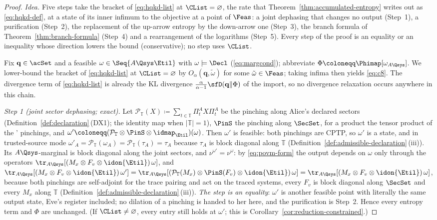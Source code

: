 \begin{proof}
\emph{Idea.} Five steps take the bracket of \eqref{eq:hqkd-list} at
$\CList=\varnothing$, the rate that Theorem~\ref{thm:accumulated-entropy}
writes out as \eqref{eq:hqkd-def}, at a state of its inner infimum to the objective at a point of $\Feas$: a joint dephasing that
changes no output (Step~1), a purification (Step~2), the replacement of the
up-arrow entropy by the down-arrow one (Step~3), the branch formula of
Theorem~\ref{thm:branch-formula} (Step~4) and a rearrangement of the
logarithms (Step~5). Every step of the proof is an equality or an inequality
whose direction lowers the bound (conservative); no step uses $\CList$.

Fix $\mathbf q\in\acSet$ and a feasible $\omega\in\Seq{A\Qsys\Etil}$ with
$\omega\models\Decl$ (\eqref{eq:margcond}); abbreviate
$\Phi\coloneqq\Phimap[\omega_{A\Qsys}]$. We
lower-bound the bracket of \eqref{eq:hqkd-list} at $\CList=\varnothing$ by
$O_{\alpha}(\mathbf q,\tilde\omega)$ for some $\tilde\omega\in\Feas$; taking
infima then yields \eqref{eq:c8}. The divergence term of
\eqref{eq:hqkd-list} is already the KL divergence
$\frac{\alpha}{\alpha-1}\sfD(\mathbf q\|\Phi)$ of the import, so no
divergence relaxation occurs anywhere in this chain.

\emph{Step 1 (joint sector dephasing; exact).} Let
$\mathcal{P}_{\mathbb{T}}(X)\coloneqq\sum_{t\in\mathbb{T}}\Pi^{A}_tX\Pi^{A}_t$ be
the pinching along Alice's declared sectors
(Definition~\ref{def:declaration}\,(DX1); the identity map when
$|\mathbb{T}|=1$), $\PinS$ the pinching along $\SecSet$, for a product
 the tensor product of the
' pinchings, and
$\omega'\coloneqq(\mathcal{P}_{\mathbb{T}}\otimes\PinS\otimes\idmap_{\Etil})(\omega)$.
Then $\omega'$ is feasible: both pinchings are CPTP, so $\omega'$ is a
state, and in trusted-source mode
$\omega'_A=\mathcal{P}_{\mathbb{T}}(\omega_A)
=\mathcal{P}_{\mathbb{T}}(\tau_A)=\tau_A$ because $\tau_A$ is block diagonal
along $\mathbb{T}$ (Definition~\ref{def:admissible-declaration}\,(iii)). Its
$A\Qsys$-marginal is block diagonal along the joint sectors, and
$\nu^{\omega'}=\nu^{\omega}$: by \eqref{eq:povm-form} the output depends on
$\omega$ only through the operators
$\tr_{A\Qsys}[(M_x\otimes F_v\otimes\idon{\Etil})\,\omega]$, and
$\tr_{A\Qsys}[(M_x\otimes F_v\otimes\idon{\Etil})\,\omega']
=\tr_{A\Qsys}[(\mathcal{P}_{\mathbb{T}}(M_x)\otimes\PinS(F_v)\otimes
\idon{\Etil})\,\omega]
=\tr_{A\Qsys}[(M_x\otimes F_v\otimes\idon{\Etil})\,\omega]$, because both
pinchings are self-adjoint for the trace pairing and act on the traced
systems, every $F_v$ is block diagonal along $\SecSet$ and every $M_x$ along
$\mathbb{T}$ (Definition~\ref{def:admissible-declaration}\,(iii)). \emph{The step is an
equality}: $\omega'$ is another feasible point with literally the same
output state, Eve's register included; no dilation of a pinching is handed
to her here, and the purification is Step~2. Hence every entropy term and $\Phi$ are unchanged.
(If $\CList\neq\varnothing$, every entry still holds at $\omega'$; this is
Corollary~\ref{cor:reduction-constrained}.)


\end{proof}
